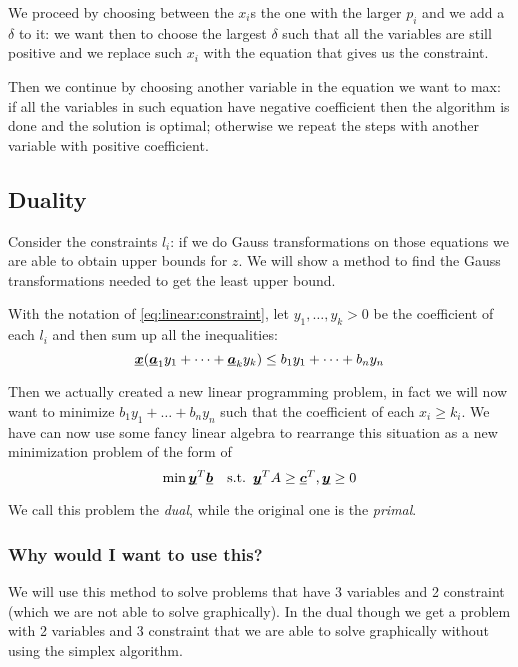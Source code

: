 \documentclass[12pt]{extarticle}
\renewcommand{\vec}[1]{\uvec{#1}}
\begin{document}
We proceed by choosing between the $x_i$s the one with the larger $p_i$ and we add a $\delta$ to it: we want then to choose the largest $\delta$ such that all the variables are still positive and we replace such $x_i$ with the equation that gives us the constraint.

Then we continue by choosing another variable in the equation we want to max:
if all the variables in such equation have negative coefficient then the algorithm is done and the solution is optimal;
otherwise we repeat the steps with another variable with positive coefficient.

\subsection{Duality}

Consider the constraints $l_i$: if we do Gauss transformations on those equations we are able to obtain upper bounds for $z$.
We will show a method to find the Gauss transformations needed to get the least upper bound.

With the notation of \autoref{eq:linear:constraint}, let $y_1, \ldots, y_k > 0$ be the coefficient of each $l_i$ and then sum up all the inequalities:
\begin{equation}
    \vec x (\vec a_1 y_1 + \dots + \vec a_k y_k) \leq b_1 y_1 + \dots + b_n y_n
\end{equation}

Then we actually created a new linear programming problem, in fact we will now want to minimize $b_1 y_1 + \dots + b_n y_n$ such that
the coefficient of each $x_i \geq k_i$.
We have can now use some fancy linear algebra to rearrange this situation as a new minimization problem of the form of
\begin{equation}
    \min \vec y^T \vec b \quad \text{s.t.} \enspace \vec y^T A \geq \vec c^T, \vec y \geq 0
\end{equation}

We call this problem the \emph{dual}, while the original one is the \emph{primal}.

\subsubsection{Why would I want to use this?}

We will use this method to solve problems that have 3 variables and 2 constraint (which we are not able to solve graphically).
In the dual though we get a problem with 2 variables and 3 constraint that we are able to solve graphically without using the simplex algorithm.
\end{document}
